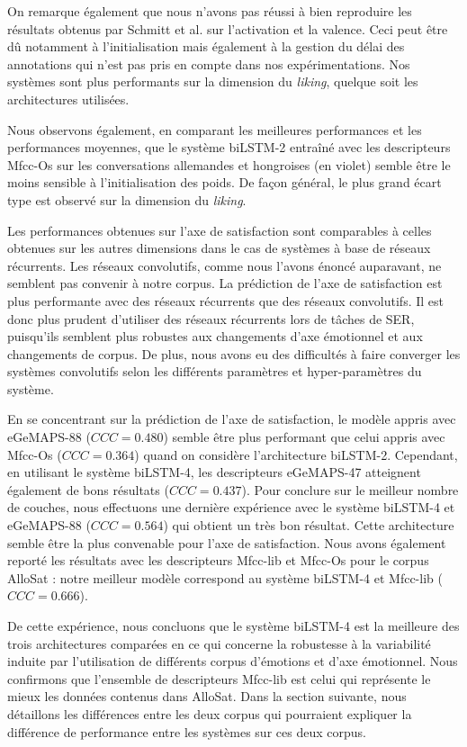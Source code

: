 On remarque également que nous n'avons pas réussi à bien reproduire les résultats obtenus par Schmitt et al. sur l'activation et la valence. Ceci peut être dû notamment à l'initialisation mais également à la gestion du délai des annotations qui n'est pas pris en compte dans nos expérimentations. Nos systèmes sont plus performants sur la dimension du \textit{liking}, quelque soit les architectures utilisées.

Nous observons également, en comparant les meilleures performances et les performances moyennes, que le système biLSTM-2 entraîné avec les descripteurs Mfcc-Os sur les conversations allemandes et hongroises (en violet) semble être le moins sensible à l'initialisation des poids. De façon général, le plus grand écart type est observé sur la dimension du \textit{liking}.

Les performances obtenues sur l'axe de satisfaction sont comparables à celles obtenues sur les autres dimensions dans le cas de systèmes à base de réseaux récurrents. Les réseaux convolutifs, comme nous l'avons énoncé auparavant, ne semblent pas convenir à notre corpus. La prédiction de l'axe de satisfaction est plus performante avec des réseaux récurrents que des réseaux convolutifs. Il est donc plus prudent d'utiliser des réseaux récurrents lors de tâches de SER, puisqu'ils semblent plus robustes aux changements d'axe émotionnel et aux changements de corpus. De plus, nous avons eu des difficultés à faire converger les systèmes convolutifs selon les différents paramètres et hyper-paramètres du système.

En se concentrant sur la prédiction de l'axe de satisfaction, le modèle appris avec eGeMAPS-88 ($CCC=0.480$) semble être plus performant que celui appris avec Mfcc-Os ($CCC=0.364$) quand on considère l'architecture biLSTM-2. Cependant, en utilisant le système biLSTM-4, les descripteurs eGeMAPS-47 atteignent également de bons résultats ($CCC=0.437$). Pour conclure sur le meilleur nombre de couches, nous effectuons une dernière expérience avec le système biLSTM-4 et eGeMAPS-88 ($CCC=0.564$) qui obtient un très bon résultat. Cette architecture semble être la plus convenable pour l'axe de satisfaction. Nous avons également reporté les résultats avec les descripteurs Mfcc-lib et Mfcc-Os pour le corpus AlloSat : notre meilleur modèle correspond au système biLSTM-4 et Mfcc-lib ($CCC=0.666$).

De cette expérience, nous concluons que le système biLSTM-4 est la meilleure des trois architectures comparées en ce qui concerne la robustesse à la variabilité induite par l'utilisation de différents corpus d'émotions et d'axe émotionnel. Nous confirmons que l'ensemble de descripteurs Mfcc-lib est celui qui représente le mieux les données contenus dans AlloSat. Dans la section suivante, nous détaillons les différences entre les deux corpus qui pourraient expliquer la différence de performance entre les systèmes sur ces deux corpus.

